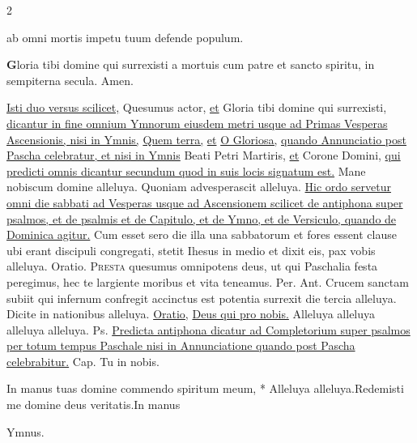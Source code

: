 \begin{multicols*}{2}
{ab omni mortis impetu
tuum defende populum.
\par {\bfseries \color{Blue} G}loria tibi domine
qui surrexisti a mortuis
cum patre et sancto spiritu,
in sempiterna secula. Amen.
}
\newline \ul{Isti duo versus scilicet,} Quesumus actor, \ul{et} Gloria tibi domine qui surrexisti, \ul{dicantur in fine omnium Ymnorum eiusdem metri usque ad Primas Vesperas Ascensionis, nisi in Ymnis,} \hyperlink{quem-terra}{Quem terra,} \ul{et} \hyperlink{o-gloriosa}{O Gloriosa,} \ul{quando Annunciatio post Pascha celebratur, et nisi in Ymnis} Beati Petri Martiris, \ul{et} Corone Domini, \ul{qui predicti omnis dicantur secundum quod in suis locis signatum est.}
\newline \V Mane nobiscum domine alleluya.
\newline \R Quoniam advesperascit alleluya.
\newline \ul{Hic ordo servetur omni die sabbati ad Vesperas usque ad Ascensionem scilicet de antiphona super psalmos, et de psalmis et de Capitulo, et de Ymno, et de Versiculo, quando de Dominica agitur.}
 Cum esset sero die illa una sabbatorum et fores essent clause ubi erant discipuli congregati, stetit Ihesus in medio et dixit eis, pax vobis alleluya. {\color{Red} Oratio.}
\lettrine[lines=2]{\zallmancaps \color{Blue} P}{resta} quesumus omnipotens deus, ut qui Paschalia festa peregimus, hec te largiente moribus et vita teneamus. Per.
 {\color{Red} Ant.} Crucem sanctam subiit qui infernum confregit accinctus est potentia surrexit die tercia alleluya. \V Dicite in nationibus alleluya. \ul{Oratio,} \hyperlink{deus-qui-pro-cruce}{Deus qui pro nobis.}
 Alleluya alleluya alleluya alleluya. {\color{Red} Ps.}     \ul{Predicta antiphona dicatur ad Completorium super psalmos per totum tempus Paschale nisi in Annunciatione quando post Pascha celebrabitur.} {\color{Red} Cap.} Tu in nobis.
\begin{responsory-final}
{In manus tuas domine commendo spiritum meum, * Alleluya alleluya.}{Redemisti me domine deus veritatis.}{In manus}
\end{responsory-final}%
{\color{Red} Ymnus.}
\end{multicols*}
